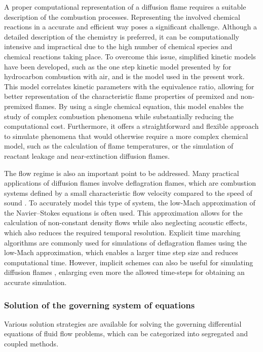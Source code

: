 A proper computational representation of a diffusion flame requires a suitable description of the combustion processes. Representing the involved chemical reactions in a accurate and efficient way poses a significant challenge. Although a detailed description of the chemistry is preferred, it can be computationally intensive and impractical due to the high number of chemical species and chemical reactions taking place. To overcome this issue, simplified kinetic models have been developed, such as the one step kinetic model presented by \textcite{fernandez-tarrazoSimpleOnestepChemistry2006} for hydrocarbon combustion with air, and is the model used in the present work. This model correlates kinetic parameters with the equivalence ratio, allowing for better representation of the characteristic flame properties of premixed and non-premixed flames. By using a single chemical equation, this model enables the study of complex combustion phenomena while substantially reducing the computational cost. Furthermore, it offers a straightforward and flexible approach to simulate phenomena that would otherwise require a more complex chemical model, such as the calculation of flame temperatures, or the simulation of reactant leakage and near-extinction diffusion flames.
 
The flow regime is also an important point to be addressed. Many practical applications of diffusion flames involve deflagration flames, which are combustion systems defined by a small characteristic flow velocity compared to the speed of sound  \parencite{poinsotTheoreticalNumericalCombustion2011}. To accurately model this type of system, the low-Mach approximation of the Navier--Stokes equations is often used. This approximation allows for the calculation of non-constant density flows while also neglecting acoustic effects, which also reduces the required temporal resolution. Explicit time marching algorithms are commonly used for simulations of deflagration flames using the low-Mach approximation, which enables a larger time step size and reduces computational time. However, implicit schemes can also be useful for simulating diffusion flames \parencite{mullerLowMachNumberAsymptoticsNavierStokes1998}, enlarging even more the allowed time-steps for obtaining an accurate simulation. 
\subsubsection{Solution of the governing system of equations}
Various solution strategies are available for solving the governing differential equations of fluid flow problems, which can be categorized into segregated and coupled methods.

